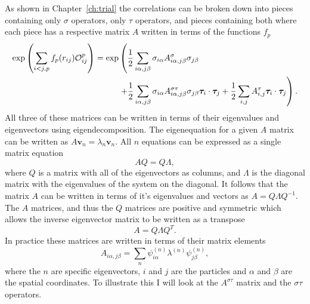 As shown in Chapter~\ref{ch:trial} the correlations can be broken down into pieces containing only $\sigma$ operators, only $\tau$ operators, and pieces containing both where each piece has a respective matrix $A$ written in terms of the functions $f_p$
\begin{equation}
\begin{split}
   \exp\left(\sum\limits_{i<j,p}f_p(r_{ij})\mathcal{O}^p_{ij}\right) = \exp&\left(\frac{1}{2}\sum\limits_{i\alpha,j\beta} \sigma_{i\alpha}A^{\sigma}_{i\alpha,j\beta}\sigma_{j\beta}\right. \\
      &\left. + \frac{1}{2}\sum\limits_{i\alpha,j\beta} \sigma_{i\alpha}A^{\sigma\tau}_{i\alpha,j\beta}\sigma_{j\beta}\bm{\tau}_i\cdot\bm{\tau}_j
      + \frac{1}{2}\sum\limits_{i,j} A^{\tau}_{i,j}\bm{\tau}_i\cdot\bm{\tau}_j\right).
\end{split}
\end{equation}
All three of these matrices can be written in terms of their eigenvalues and eigenvectors using eigendecomposition. The eigenequation for a given $A$ matrix can be written as $A\mathbf{v}_n = \lambda_n\mathbf{v}_n$. All $n$ equations can be expressed as a single matrix equation
\begin{equation}
   AQ = Q\Lambda,
\end{equation}
where $Q$ is a matrix with all of the eigenvectors as columns, and $\Lambda$ is the diagonal matrix with the eigenvalues of the system on the diagonal. It follows that the matrix $A$ can be written in terms of it's eigenvalues and vectors as $A = Q\Lambda Q^{-1}$. The $A$ matrices, and thus the $Q$ matrices are positive and symmetric which allows the inverse eigenvector matrix to be written as a transpose
\begin{equation}
   A = Q\Lambda Q^T.
\end{equation}
In practice these matrices are written in terms of their matrix elements
\begin{equation}
   A_{i\alpha,j\beta} = \sum\limits_n \psi^{(n)}_{i\alpha}\lambda^{(n)}\psi^{(n)}_{j\beta},
\end{equation}
where the $n$ are specific eigenvectors, $i$ and $j$ are the particles and $\alpha$ and $\beta$ are the spatial coordinates. To illustrate this I will look at the $A^{\sigma\tau}$ matrix and the $\sigma\tau$ operators.

